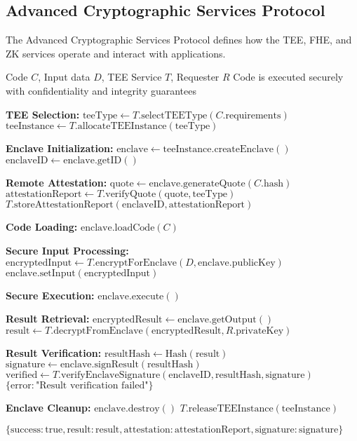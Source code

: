 \subsection{Advanced Cryptographic Services Protocol}
\label{subsec:advanced-crypto-protocol}

The Advanced Cryptographic Services Protocol defines how the TEE, FHE, and ZK services operate and interact with applications.

\begin{protocol}
\label{prot:tee-execution}
\begin{algorithmic}[1]
\Require Code $C$, Input data $D$, TEE Service $T$, Requester $R$
\Ensure Code is executed securely with confidentiality and integrity guarantees

\State \textbf{TEE Selection:}
\State $\text{teeType} \gets T.\text{selectTEEType}(C.\text{requirements})$
\State $\text{teeInstance} \gets T.\text{allocateTEEInstance}(\text{teeType})$

\State \textbf{Enclave Initialization:}
\State $\text{enclave} \gets \text{teeInstance}.\text{createEnclave}()$
\State $\text{enclaveID} \gets \text{enclave}.\text{getID}()$

\State \textbf{Remote Attestation:}
\State $\text{quote} \gets \text{enclave}.\text{generateQuote}(C.\text{hash})$
\State $\text{attestationReport} \gets T.\text{verifyQuote}(\text{quote}, \text{teeType})$
\State $T.\text{storeAttestationReport}(\text{enclaveID}, \text{attestationReport})$

\State \textbf{Code Loading:}
\State $\text{enclave}.\text{loadCode}(C)$

\State \textbf{Secure Input Processing:}
\State $\text{encryptedInput} \gets T.\text{encryptForEnclave}(D, \text{enclave}.\text{publicKey})$
\State $\text{enclave}.\text{setInput}(\text{encryptedInput})$

\State \textbf{Secure Execution:}
\State $\text{enclave}.\text{execute}()$

\State \textbf{Result Retrieval:}
\State $\text{encryptedResult} \gets \text{enclave}.\text{getOutput}()$
\State $\text{result} \gets T.\text{decryptFromEnclave}(\text{encryptedResult}, R.\text{privateKey})$

\State \textbf{Result Verification:}
\State $\text{resultHash} \gets \text{Hash}(\text{result})$
\State $\text{signature} \gets \text{enclave}.\text{signResult}(\text{resultHash})$
\State $\text{verified} \gets T.\text{verifyEnclaveSignature}(\text{enclaveID}, \text{resultHash}, \text{signature})$
    \State \Return $\{\text{error}: \text{"Result verification failed"}\}$
\EndIf

\State \textbf{Enclave Cleanup:}
\State $\text{enclave}.\text{destroy}()$
\State $T.\text{releaseTEEInstance}(\text{teeInstance})$

\State \Return $\{\text{success}: \text{true}, \text{result}: \text{result}, \text{attestation}: \text{attestationReport}, \text{signature}: \text{signature}\}$
\end{algorithmic}
\end{protocol}

